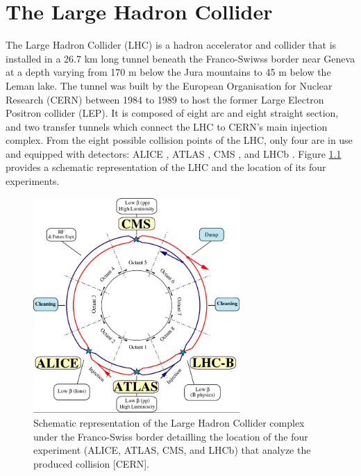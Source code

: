 \chapter{The Large Hadron Collider}
\label{chap:I-2-lhc}

	The Large Hadron Collider (LHC) \cite{Evans:2008zzb} is a hadron accelerator and collider that is installed in a 26.7 km long tunnel beneath the Franco-Swiwss border near Geneva at a depth varying from 170 m below the Jura mountains to 45 m below the Leman lake. The tunnel was built by the European Organisation for Nuclear Research (CERN) between 1984 to 1989 to host the former Large Electron Positron collider (LEP). It is composed of eight arc and eight straight section, and two transfer tunnels which connect the LHC to CERN's main injection complex. From the eight possible collision points of the LHC, only four are in use and equipped with detectors: ALICE \cite{1748-0221-3-08-S08002}, ATLAS \cite{1748-0221-3-08-S08003}, CMS \cite{1748-0221-3-08-S08004}, and LHCb \cite{1748-0221-3-08-S08005}. Figure \ref{fig:I-2-lhc-schematic} provides a schematic representation of the LHC and the location of its four experiments. \\

	\begin{figure}[h!]
		\centering
		\includegraphics[width=0.7\textwidth]{img/I-2-lhc/lhc.jpg}
		\caption{Schematic representation of the Large Hadron Collider complex under the Franco-Swiss border detailling the location of the four experiment (ALICE, ATLAS, CMS, and LHCb) that analyze the produced collision [CERN].}
		\label{fig:I-2-lhc-schematic}
	\end{figure}

